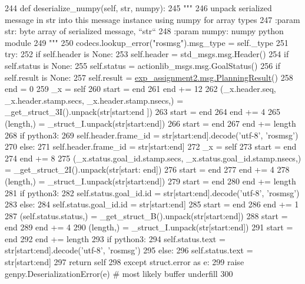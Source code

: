 \begin{DoxyCode}
244   \textcolor{keyword}{def }deserialize\_numpy(self, str, numpy):
245     \textcolor{stringliteral}{"""}
246 \textcolor{stringliteral}{    unpack serialized message in str into this message instance using numpy for array types}
247 \textcolor{stringliteral}{    :param str: byte array of serialized message, ``str``}
248 \textcolor{stringliteral}{    :param numpy: numpy python module}
249 \textcolor{stringliteral}{    """}
250     codecs.lookup\_error(\textcolor{stringliteral}{"rosmsg"}).msg\_type = self.\_type
251     \textcolor{keywordflow}{try}:
252       \textcolor{keywordflow}{if} self.header \textcolor{keywordflow}{is} \textcolor{keywordtype}{None}:
253         self.header = std\_msgs.msg.Header()
254       \textcolor{keywordflow}{if} self.status \textcolor{keywordflow}{is} \textcolor{keywordtype}{None}:
255         self.status = actionlib\_msgs.msg.GoalStatus()
256       \textcolor{keywordflow}{if} self.result \textcolor{keywordflow}{is} \textcolor{keywordtype}{None}:
257         self.result = \hyperlink{classexp__assignment2_1_1msg_1_1__PlanningResult_1_1PlanningResult}{exp\_assignment2.msg.PlanningResult}()
258       end = 0
259       \_x = self
260       start = end
261       end += 12
262       (\_x.header.seq, \_x.header.stamp.secs, \_x.header.stamp.nsecs,) = \_get\_struct\_3I().unpack(str[start:end
      ])
263       start = end
264       end += 4
265       (length,) = \_struct\_I.unpack(str[start:end])
266       start = end
267       end += length
268       \textcolor{keywordflow}{if} python3:
269         self.header.frame\_id = str[start:end].decode(\textcolor{stringliteral}{'utf-8'}, \textcolor{stringliteral}{'rosmsg'})
270       \textcolor{keywordflow}{else}:
271         self.header.frame\_id = str[start:end]
272       \_x = self
273       start = end
274       end += 8
275       (\_x.status.goal\_id.stamp.secs, \_x.status.goal\_id.stamp.nsecs,) = \_get\_struct\_2I().unpack(str[start:
      end])
276       start = end
277       end += 4
278       (length,) = \_struct\_I.unpack(str[start:end])
279       start = end
280       end += length
281       \textcolor{keywordflow}{if} python3:
282         self.status.goal\_id.id = str[start:end].decode(\textcolor{stringliteral}{'utf-8'}, \textcolor{stringliteral}{'rosmsg'})
283       \textcolor{keywordflow}{else}:
284         self.status.goal\_id.id = str[start:end]
285       start = end
286       end += 1
287       (self.status.status,) = \_get\_struct\_B().unpack(str[start:end])
288       start = end
289       end += 4
290       (length,) = \_struct\_I.unpack(str[start:end])
291       start = end
292       end += length
293       \textcolor{keywordflow}{if} python3:
294         self.status.text = str[start:end].decode(\textcolor{stringliteral}{'utf-8'}, \textcolor{stringliteral}{'rosmsg'})
295       \textcolor{keywordflow}{else}:
296         self.status.text = str[start:end]
297       \textcolor{keywordflow}{return} self
298     \textcolor{keywordflow}{except} struct.error \textcolor{keyword}{as} e:
299       \textcolor{keywordflow}{raise} genpy.DeserializationError(e)  \textcolor{comment}{# most likely buffer underfill}
300 
\end{DoxyCode}
